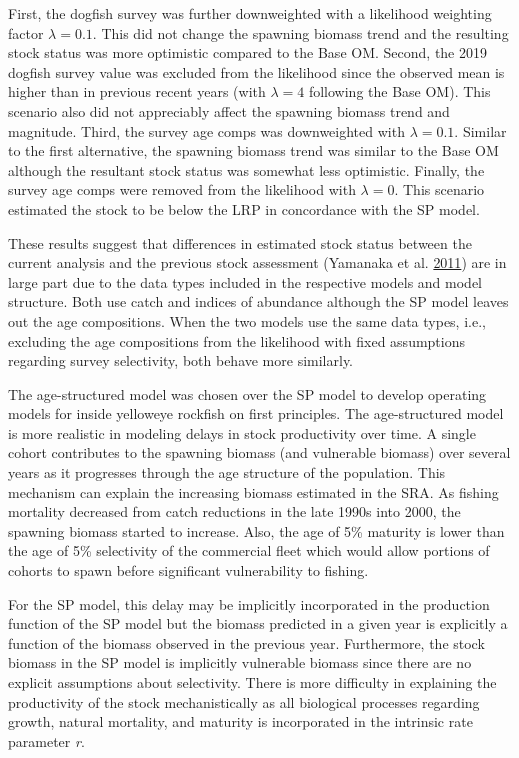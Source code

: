 \documentclass[11pt]{book}
\begin{document}
First, the dogfish survey was further downweighted with a likelihood weighting factor \(\lambda = 0.1\). This did not change the spawning biomass trend and the resulting stock status was more optimistic compared to the Base OM. Second, the 2019 dogfish survey value was excluded from the likelihood since the observed mean is higher than in previous recent years (with \(\lambda = 4\) following the Base OM). This scenario also did not appreciably affect the spawning biomass trend and magnitude. Third, the survey age comps was downweighted with \(\lambda = 0.1\). Similar to the first alternative, the spawning biomass trend was similar to the Base OM although the resultant stock status was somewhat less optimistic. Finally, the survey age comps were removed from the likelihood with \(\lambda = 0\). This scenario estimated the stock to be below the LRP in concordance with the SP model.

These results suggest that differences in estimated stock status between the current analysis and the previous stock assessment (Yamanaka et al. \protect\hyperlink{ref-yamanaka2011}{2011}) are in large part due to the data types included in the respective models and model structure. Both use catch and indices of abundance although the SP model leaves out the age compositions. When the two models use the same data types, i.e., excluding the age compositions from the likelihood with fixed assumptions regarding survey selectivity, both behave more similarly.

The age-structured model was chosen over the SP model to develop operating models for inside yelloweye rockfish on first principles. The age-structured model is more realistic in modeling delays in stock productivity over time. A single cohort contributes to the spawning biomass (and vulnerable biomass) over several years as it progresses through the age structure of the population. This mechanism can explain the increasing biomass estimated in the SRA. As fishing mortality decreased from catch reductions in the late 1990s into 2000, the spawning biomass started to increase. Also, the age of 5\% maturity is lower than the age of 5\% selectivity of the commercial fleet which would allow portions of cohorts to spawn before significant vulnerability to fishing.

For the SP model, this delay may be implicitly incorporated in the production function of the SP model but the biomass predicted in a given year is explicitly a function of the biomass observed in the previous year. Furthermore, the stock biomass in the SP model is implicitly vulnerable biomass since there are no explicit assumptions about selectivity. There is more difficulty in explaining the productivity of the stock mechanistically as all biological processes regarding growth, natural mortality, and maturity is incorporated in the intrinsic rate parameter \emph{r}.
\end{document}
